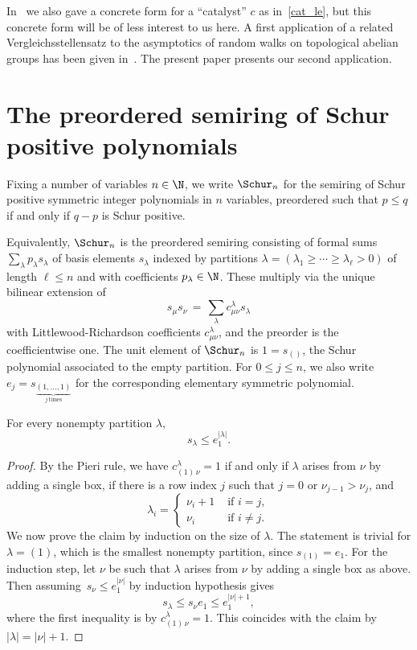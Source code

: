 In~\cite{vergleichsstellensatz} we also gave a concrete form for a ``catalyst'' $c$ as in~\eqref{cat_le}, but this concrete form will be of less interest to us here.
A first application of a related Vergleichsstellensatz to the asymptotics of random walks on topological abelian groups has been given in~\cite{random_walks}.
The present paper presents our second application.

\section{The preordered semiring of Schur positive polynomials}
\label{sec_schur}

Fixing a number of variables $n \in \N$, we write $\Schur_n$ for the semiring of Schur positive symmetric integer polynomials in $n$ variables, preordered such that $p \le q$ if and only if $q - p$ is Schur positive.

Equivalently, $\Schur_n$ is the preordered semiring consisting of formal sums $\sum_\lambda p_\lambda s_\lambda$ of basis elements $s_\lambda$ indexed by partitions $\lambda = (\lambda_1 \ge \cdots \ge \lambda_\ell > 0)$ of length $\ell \le n$ and with coefficients $p_\lambda \in \N$. These multiply via the unique bilinear extension of
\begin{equation}
	\label{LR_mult}
	s_\mu s_\nu \,=\, \sum_\lambda c^\lambda_{\mu\nu} s_\lambda
\end{equation}
with Littlewood-Richardson coefficients $c^\lambda_{\mu\nu}$, and the preorder is the coefficientwise one.
The unit element of $\Schur_n$ is $1 = s_{()}$, the Schur polynomial associated to the empty partition.
For $0 \le j \le n$, we also write $e_j = s_{\underbrace{\scriptstyle{(1,\ldots,1)}}_{j\:\mathrm{times}}}$ for the corresponding elementary symmetric polynomial.

\begin{lemm}
	\label{schur_bound}
	For every nonempty partition $\lambda$,
	\[
		s_\lambda \le e_1^{|\lambda|}.
	\]
\end{lemm}

\begin{proof}
	By the Pieri rule, we have $c^\lambda_{(1)\, \nu} = 1$ if and only if $\lambda$ arises from $\nu$ by adding a single box, \ie{}if there is a row index $j$ such that $j = 0$ or $\nu_{j-1} > \nu_j$, and
	\[
		\lambda_i = \begin{cases}	\nu_i + 1 & \textrm{ if } i = j, \\
						\nu_i & \textrm{ if } i \neq j. \end{cases}
	\]
	We now prove the claim by induction on the size of $\lambda$.
	The statement is trivial for $\lambda = (1)$, which is the smallest nonempty partition, since $s_{(1)} = e_1$.
	For the induction step, let $\nu$ be such that $\lambda$ arises from $\nu$ by adding a single box as above.
	Then assuming~$s_\nu \le e_1^{|\nu|}$ by induction hypothesis gives
	\[
		s_\lambda \le s_\nu e_1 \le e_1^{|\nu|+1},
	\]
	where the first inequality is by $c^\lambda_{(1)\, \nu} = 1$.
	This coincides with the claim by $|\lambda| = |\nu| + 1$.
\end{proof}

